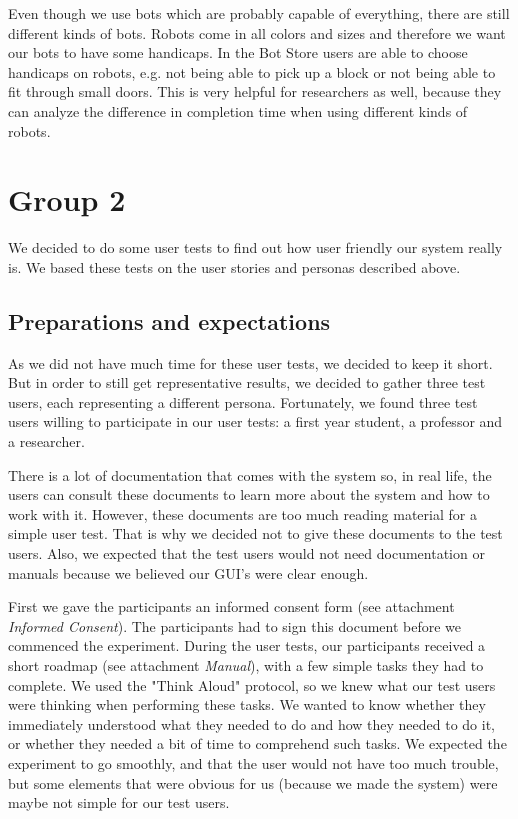 Even though we use bots which are probably capable of everything, there are still different kinds of bots. Robots come in all colors and sizes and therefore we want our bots to have some handicaps. In the Bot Store users are able to choose handicaps on robots, e.g. not being able to pick up a block or not being able to fit through small doors. This is very helpful for researchers as well, because they can analyze the difference in completion time when using different kinds of robots.

\section{Group 2}
We decided to do some user tests to find out how user friendly our system really is. We based these tests on the user stories and personas described above.

\subsection*{Preparations and expectations }
As we did not have much time for these user tests, we decided to keep it short. But in order to still get representative results, we decided to gather three test users, each representing a different persona. Fortunately, we found three test users willing to participate in our user tests: a first year student, a professor and a researcher.

There is a lot of documentation that comes with the system so, in real life, the users can consult these documents to learn more about the system and how to work with it. However, these documents are too much reading material for a simple user test. That is why we decided not to give these documents to the test users. Also, we expected that the test users would not need documentation or manuals because we believed our GUI's were clear enough.

First we gave the participants an informed consent form (see attachment \textit{Informed Consent}). The participants had to sign this document before we commenced the experiment.
During the user tests, our participants received a short roadmap (see attachment \textit{Manual}), with a few simple tasks they had to complete. We used the "Think Aloud" protocol, so we knew what our test users were thinking when performing these tasks. We wanted to know whether they immediately understood what they needed to do and how they needed to do it, or whether they needed a bit of time to comprehend such tasks. We expected the experiment to go smoothly, and that the user would not have too much trouble, but some elements that were obvious for us (because we made the system) were maybe not simple for our test users.


